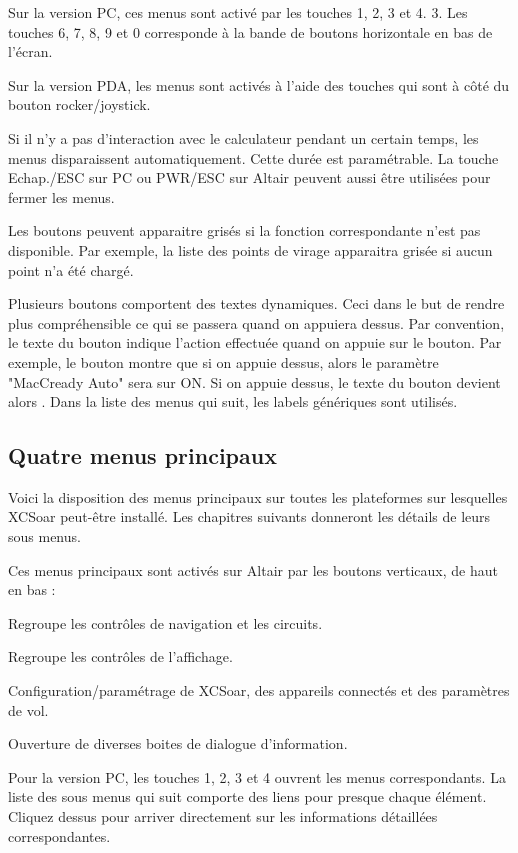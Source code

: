 Sur la version PC, ces menus sont activé par les touches 1, 2, 3 et 4. 3. Les touches 6, 7, 8, 9 et 0 corresponde à la bande de boutons horizontale en bas de l'écran.

Sur la version PDA, les menus sont activés à l'aide des touches qui sont à côté du bouton rocker/joystick.

Si il n'y a pas d'interaction avec le calculateur pendant un certain temps, les menus disparaissent automatiquement. Cette durée est paramétrable. La touche Echap./ESC sur PC ou PWR/ESC sur Altair peuvent aussi être utilisées pour fermer les menus. 

Les boutons peuvent apparaitre grisés si la fonction correspondante n'est pas disponible. Par exemple, la liste des points de virage apparaitra grisée si aucun point n'a été chargé.

Plusieurs boutons comportent des textes dynamiques. Ceci dans le but de rendre plus compréhensible ce qui se passera quand on appuiera dessus. Par convention, le texte du bouton indique l'action effectuée quand on appuie sur le bouton. Par exemple, le bouton  montre que si on appuie dessus, alors le paramètre "MacCready Auto" sera sur ON. Si on appuie dessus, le texte du bouton devient alors . Dans la liste des menus qui suit, les labels génériques sont utilisés.

\subsection*{Quatre menus principaux}
Voici la disposition des menus principaux sur toutes les plateformes sur lesquelles XCSoar peut-être installé. Les chapitres suivants donneront les détails de leurs sous menus.

Ces menus principaux sont activés sur Altair par les boutons verticaux, de haut en bas :
\begin{jspecs}
\item[\bmenug{Nav.}] Regroupe les contrôles de navigation et les circuits.
\item[\bmenug{Affich.}] Regroupe les contrôles de l'affichage.
\item[\bmenug{Config.}] Configuration/paramétrage de XCSoar, des appareils connectés et des paramètres de vol.
\item[\bmenug{Info.}] Ouverture de diverses boites de dialogue d'information. 
\end{jspecs}

Pour la version PC, les touches 1, 2, 3 et 4 ouvrent les menus correspondants. La liste des sous menus qui suit comporte des liens pour presque chaque élément. Cliquez dessus pour arriver directement sur les informations détaillées correspondantes.

